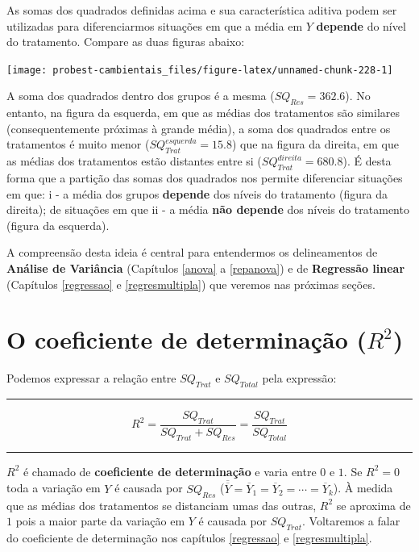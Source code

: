 \documentclass[
]{book}
\begin{document}
As somas dos quadrados definidas acima e sua característica aditiva podem ser utilizadas para diferenciarmos situações em que a média em \(Y\) \textbf{depende} do nível do tratamento. Compare as duas figuras abaixo:

\begin{center}\texttt{[image: probest-cambientais\_files/figure-latex/unnamed-chunk-228-1]} \end{center}

A soma dos quadrados dentro dos grupos é a mesma (\(SQ_{Res} = 362.6\)). No entanto, na figura da esquerda, em que as médias dos tratamentos são similares (consequentemente próximas à grande média), a soma dos quadrados entre os tratamentos é muito menor (\(SQ_{Trat}^{esquerda} = 15.8\)) que na figura da direita, em que as médias dos tratamentos estão distantes entre si (\(SQ_{Trat}^{direita} = 680.8\)). É desta forma que a partição das somas dos quadrados nos permite diferenciar situações em que: i - a média dos grupos \textbf{depende} dos níveis do tratamento (figura da direita); de situações em que ii - a média \textbf{não depende} dos níveis do tratamento (figura da esquerda).

A compreensão desta ideia é central para entendermos os delineamentos de \textbf{Análise de Variância} (Capítulos \ref{anova} a \ref{repanova}) e de \textbf{Regressão linear} (Capítulos \ref{regressao} e \ref{regresmultipla}) que veremos nas próximas seções.

\hypertarget{o-coeficiente-de-determinauxe7uxe3o-r2}{%
\section{\texorpdfstring{O coeficiente de determinação (\(R^2\))}{O coeficiente de determinação (R\^{}2)}}\label{o-coeficiente-de-determinauxe7uxe3o-r2}}

Podemos expressar a relação entre \(SQ_{Trat}\) e \(SQ_{Total}\) pela expressão:

\begin{center}\rule{0.5\linewidth}{0.5pt}\end{center}

\[R^2 = \frac{SQ_{Trat}}{SQ_{Trat} + SQ_{Res}} = \frac{SQ_{Trat}}{SQ_{Total}}\]

\begin{center}\rule{0.5\linewidth}{0.5pt}\end{center}

\(R^2\) é chamado de \textbf{coeficiente de determinação} e varia entre \(0\) e \(1\). Se \(R^2 = 0\) toda a variação em \(Y\) é causada por \(SQ_{Res}\) (\(\overline{\overline{Y}} = \overline{Y}_1 = \overline{Y}_2 = \cdots = \overline{Y}_k\)). À medida que as médias dos tratamentos se distanciam umas das outras, \(R^2\) se aproxima de \(1\) pois a maior parte da variação em \(Y\) é causada por \(SQ_{Trat}\). Voltaremos a falar do coeficiente de determinação nos capítulos \ref{regressao} e \ref{regresmultipla}.
\end{document}
